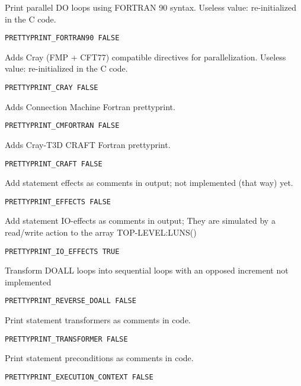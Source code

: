 Print parallel DO loops using FORTRAN 90 syntax. Useless value:
re-initialized in the C code.

\begin{verbatim}
PRETTYPRINT_FORTRAN90 FALSE
\end{verbatim}

Adds Cray (FMP + CFT77) compatible directives for parallelization.
Useless value: re-initialized in the C code.

\begin{verbatim}
PRETTYPRINT_CRAY FALSE
\end{verbatim}

Adds Connection Machine Fortran prettyprint.

\begin{verbatim}
PRETTYPRINT_CMFORTRAN FALSE
\end{verbatim}

Adds Cray-T3D CRAFT Fortran prettyprint.

\begin{verbatim}
PRETTYPRINT_CRAFT FALSE
\end{verbatim}

Add statement effects as comments in output; not implemented (that way) yet.

\begin{verbatim}
PRETTYPRINT_EFFECTS FALSE
\end{verbatim}

Add statement IO-effects as comments in output; They are simulated by
a read/write action to the array TOP-LEVEL:LUNS()

\begin{verbatim}
PRETTYPRINT_IO_EFFECTS TRUE
\end{verbatim}

Transform DOALL loops into sequential loops with an opposed increment
not implemented

\begin{verbatim}
PRETTYPRINT_REVERSE_DOALL FALSE
\end{verbatim}

Print statement transformers as comments in code.

\begin{verbatim}
PRETTYPRINT_TRANSFORMER FALSE
\end{verbatim}

Print statement preconditions as comments in code.

\begin{verbatim}
PRETTYPRINT_EXECUTION_CONTEXT FALSE
\end{verbatim}

